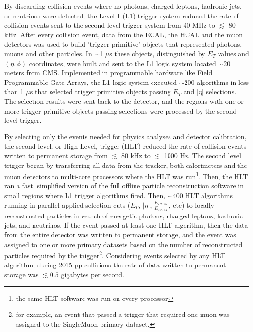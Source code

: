 By discarding collision events where no photons, charged leptons, hadronic jets, or neutrinos were 
detected, the Level-1 (L1) trigger system reduced the rate of collision events sent to the second 
level trigger system from 40 MHz to $\lesssim$ 80 kHz.  After every collision event, data from 
the ECAL, the HCAL and the muon detectors was used to build 'trigger 
primitive' objects that represented photons, muons and other particles.  In $\sim$1 $\mu$s these objects, 
distinguished by $E_{T}$ values and $(\eta, \phi)$ coordinates, were built and sent to the L1 logic system located 
$\sim$20 meters from CMS.  Implemented in programmable hardware like Field Programmable Gate Arrays, the L1 
logic system executed $\sim$200 algorithms in less than 1 $\mu$s that selected trigger primitive objects passing $E_{T}$ 
and $|\eta|$ selections.  The selection results were sent back to the detector, and the regions with one 
or more trigger primitive objects passing selections were processed by the second level trigger.

By selecting only the events needed for physics analyses and detector calibration, the second 
level, or High Level, trigger (HLT) reduced the rate of collision events written to permanent storage 
from $\lesssim$ 80 kHz to $\lesssim$ 1000 Hz.  The second level trigger began by transferring all data from the tracker, 
both calorimeters and the muon detectors to multi-core processors where the HLT was run\footnote{the same HLT software was run on every processor}.  
Then, the HLT ran a fast, simplified version of the full offline particle reconstruction software in small 
regions where L1 trigger algorithms fired.  Then, $\sim$400 HLT algorithms running in 
parallel applied selection cuts ($E_{T}$, $|\eta|$, $\frac{E_{HCAL}}{E_{ECAL}}$, etc) to locally reconstructed particles in search of 
energetic photons, charged leptons, hadronic jets, and neutrinos.  If the event passed at least one 
HLT algorithm, then the data from the entire detector was written to permanent storage, and the event 
was assigned to one or more primary datasets based on the number of reconstructed particles required 
by the trigger\footnote{for example, an event that passed a trigger that required one muon was assigned to the SingleMuon primary dataset.}.
Considering events selected by any HLT algorithm, during 2015 pp collisions the rate of data written to 
permanent storage was $\lesssim 0.5$ gigabytes per second.

